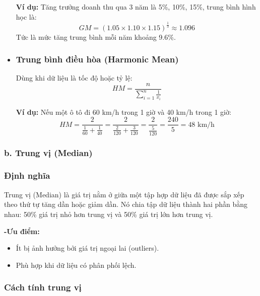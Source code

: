 \begin{itemize}
    \textbf{Ví dụ:} Tăng trưởng doanh thu qua 3 năm là 5\%, 10\%, 15\%, trung bình hình học là:
    \begin{equation}
    GM = \left(1.05 \times 1.10 \times 1.15 \right)^{\frac{1}{3}} \approx 1.096
    \end{equation}
    Tức là mức tăng trung bình mỗi năm khoảng 9.6\%.


    \item \subsubsection{Trung bình điều hòa (Harmonic Mean)}
    Dùng khi dữ liệu là tốc độ hoặc tỷ lệ:
    \begin{equation}
    HM = \frac{n}{\sum_{i=1}^{n} \frac{1}{x_i}}
    \end{equation}
    
    \textbf{Ví dụ:} Nếu một ô tô đi 60 km/h trong 1 giờ và 40 km/h trong 1 giờ:
    \begin{equation}
    HM = \frac{2}{\frac{1}{60} + \frac{1}{40}} = \frac{2}{\frac{2}{120} + \frac{3}{120}} = \frac{2}{\frac{5}{120}} = \frac{240}{5} = 48 \text{ km/h}
    \end{equation}
    
\end{itemize}


\subsubsection{b. Trung vị (Median)}
\subsubsection{Định nghĩa}
Trung vị (Median) là giá trị nằm ở giữa một tập hợp dữ liệu đã được sắp xếp theo thứ tự tăng dần hoặc giảm dần. Nó chia tập dữ liệu thành hai phần bằng nhau: 50\% giá trị nhỏ hơn trung vị và 50\% giá trị lớn hơn trung vị.

\noindent \textbf{-Ưu điểm:}
\begin{itemize}
    \item Ít bị ảnh hưởng bởi giá trị ngoại lai (outliers).
    \item Phù hợp khi dữ liệu có phân phối lệch.
\end{itemize}

\subsubsection{Cách tính trung vị}
